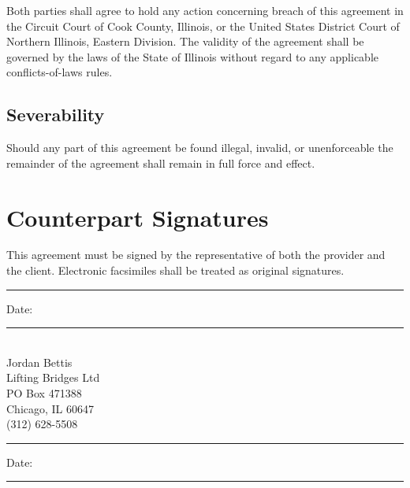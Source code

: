 \documentclass[11pt]{article}
\begin{document}
Both parties shall agree to hold any action concerning breach of this
agreement in the Circuit Court of Cook County, Illinois, or the United
States District Court of Northern Illinois, Eastern Division. The
validity of the agreement shall be governed by the laws of the State
of Illinois without regard to any applicable conflicts-of-laws rules.

\subsection{Severability}

Should any part of this agreement be found illegal, invalid, or
unenforceable the remainder of the agreement shall remain in full force
and effect.

\newpage
\section{Counterpart Signatures}

This agreement must be signed by the representative of both the
provider and the client. Electronic facsimiles shall be treated as
original signatures.

\vspace{2in}
\hspace{-.25in}\rule{3.5in}{.2mm} Date: \rule{1.5in}{.2mm}\\
\vspace{0.2em}
Jordan Bettis\\
Lifting Bridges Ltd\\
PO Box 471388\\
Chicago, IL 60647\\
(312) 628-5508

\vspace{2in}
\hspace{-.25in}\rule{3.5in}{.2mm} Date: \rule{1.5in}{.2mm}\\
\vspace{0.2em}
\theclientprinciple\\
\theclient\\
\theclientaddress{}
\end{document}
